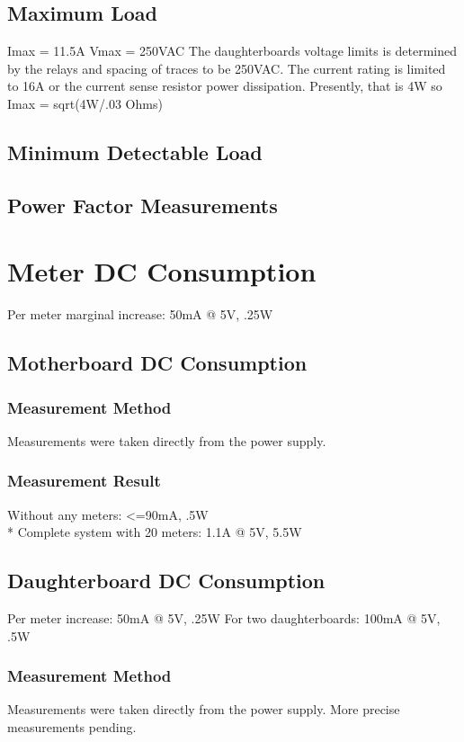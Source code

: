 \documentclass[]{article}
\begin{document}
\subsection{Maximum Load}
Imax = 11.5A
Vmax = 250VAC
The daughterboards voltage limits is determined by the relays and spacing of traces to be 250VAC.
The current rating is limited to 16A or the current sense resistor power dissipation. Presently, that is 4W so Imax = sqrt(4W/.03 Ohms)

\subsection{Minimum Detectable Load}

\subsection{Power Factor Measurements}

\section{Meter DC Consumption}
    Per meter marginal increase: 50mA @ 5V, .25W

\subsection{Motherboard DC Consumption}

\subsubsection{Measurement Method}
    Measurements were taken directly from the power supply.
\subsubsection{Measurement Result}
    Without any meters: <=90mA, .5W \\*
    Complete system with 20 meters: 1.1A @ 5V, 5.5W

\subsection{Daughterboard DC Consumption}
    Per meter increase: 50mA @ 5V, .25W
    For two daughterboards: 100mA @ 5V, .5W

\subsubsection{Measurement Method}
    Measurements were taken directly from the power supply. More precise measurements pending.
\end{document}
